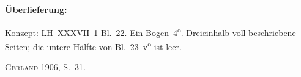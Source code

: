 %
%
%
\begin{ledgroupsized}[r]{120mm}
\footnotesize
\pstart
\noindent\textbf{Überlieferung:}
\pend
\end{ledgroupsized}
\begin{ledgroupsized}[r]{114mm}
\footnotesize
\pstart \parindent -6mm
%
Konzept: LH~XXXVII~1 Bl.~22.
Ein Bogen~4\textsuperscript{o}.
Dreieinhalb voll beschriebene Seiten;
die untere Hälfte von Bl.~23~v\textsuperscript{o} ist leer.
\pend
\end{ledgroupsized}
%
\begin{ledgroupsized}[r]{114mm}
\footnotesize%
\pstart%
\parindent -6mm
%
\textsc{Gerland} 1906, S.~31.\cite{00197}
\pend%
\end{ledgroupsized}
%
\vspace*{5mm}
